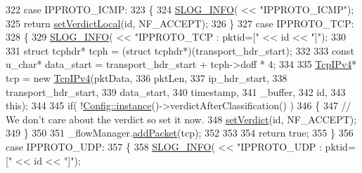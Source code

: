 \begin{DoxyCode}
322             \textcolor{keywordflow}{case} IPPROTO\_ICMP:
323             \{
324                 \hyperlink{_logger_8h_a119c1c29ba35a8db38e2358e41167282}{SLOG\_INFO}( << \textcolor{stringliteral}{"IPPROTO\_ICMP"});
325                 \textcolor{keywordflow}{return} \hyperlink{class_vsid_netfilter_1_1_packet_handler_a579cb580e2801acc62e56336b59242c4}{setVerdictLocal}(\textcolor{keywordtype}{id}, NF\_ACCEPT);
326             \}
327             \textcolor{keywordflow}{case} IPPROTO\_TCP:
328             \{
329                 \hyperlink{_logger_8h_a119c1c29ba35a8db38e2358e41167282}{SLOG\_INFO}( << \textcolor{stringliteral}{"IPPROTO\_TCP : pktid=["} << \textcolor{keywordtype}{id} << \textcolor{stringliteral}{"]"});
330 
331                 \textcolor{keyword}{struct }tcphdr* tcph = (\textcolor{keyword}{struct }tcphdr*)(transport\_hdr\_start);
332 
333                 \textcolor{keyword}{const} u\_char* data\_start = transport\_hdr\_start  + tcph->doff * 4;
334                 
335                 \hyperlink{class_vsid_common_1_1_tcp_i_pv4}{TcpIPv4}* tcp = \textcolor{keyword}{new} \hyperlink{class_vsid_common_1_1_tcp_i_pv4}{TcpIPv4}(pktData, 
336                                         pktLen, 
337                                         ip\_hdr\_start, 
338                                         transport\_hdr\_start, 
339                                         data\_start, 
340                                         timestamp, 
341                                         \_buffer,
342                                         \textcolor{keywordtype}{id},
343                                         \textcolor{keyword}{this});
344 
345                 \textcolor{keywordflow}{if}( !\hyperlink{class_vsid_netfilter_1_1_config_abf1d4539011ef83cac0fef2ac864a3a9}{Config::instance}()->verdictAfterClassification() )
346                 \{
347                     \textcolor{comment}{// We don't care about the verdict so set it now.}
348                     \hyperlink{class_vsid_netfilter_1_1_packet_handler_abb5ca3f313ceaed495dd06ce56bdf849}{setVerdict}(\textcolor{keywordtype}{id}, NF\_ACCEPT);
349                 \}
350 
351                 \_flowManager.\hyperlink{class_vsid_common_1_1_flow_manager_a9c840fe2a6650079a3b90ba2d65f1e7e}{addPacket}(tcp);
352 
353                 
354                 \textcolor{keywordflow}{return} \textcolor{keyword}{true};
355             \}
356             \textcolor{keywordflow}{case} IPPROTO\_UDP:
357             \{
358                 \hyperlink{_logger_8h_a119c1c29ba35a8db38e2358e41167282}{SLOG\_INFO}( << \textcolor{stringliteral}{"IPPROTO\_UDP : pktid=["} << \textcolor{keywordtype}{id} << \textcolor{stringliteral}{"]"});

\end{DoxyCode}
